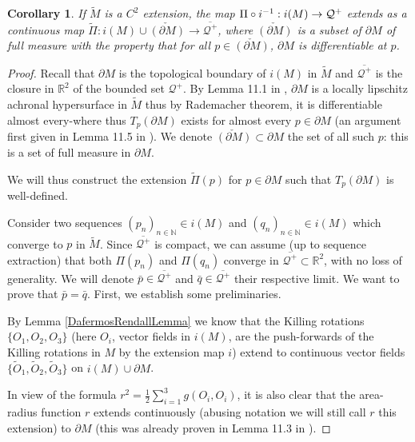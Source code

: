 \documentclass[10pt,a4paper]{article}
\theoremstyle{plain}
\newtheorem{cor}[thm]{Corollary}
\theoremstyle{remark}
\newcommand{\Oo}{\tilde{O}_1}
\newcommand{\Ot}{\tilde{O}_2}
\newcommand{\Oth}{\tilde{O}_3}
\theoremstyle{definition}
\newcommand{\RR}{\mathbb{R}}
\theoremstyle{plain}
\theoremstyle{remark}
\theoremstyle{definition}
\numberwithin{equation}{section}
\begin{document}
\begin{cor} \label{Piextension}
If $\tilde{M}$ is a $C^2$ extension, the map $\Pi \circ i^{-1}: i(M) \color{black} \rightarrow \mathcal{Q}^+$ extends as a continuous map 	$\tilde{\Pi}: i(M) \cup\check{(\partial M)}  \rightarrow \overline{\mathcal{Q}^+}$, where $\check{(\partial M)}$ is a subset of $\partial M$ of full measure with the property that for all $p\in \check{(\partial M)}$,  $\partial M$ is differentiable at $p$. 
\end{cor}\begin{proof} 
Recall that $\partial M$ is the topological boundary of $i(M)$ in $\tilde{M}$ and $\overline{\mathcal{Q}^+}$ is the closure in $\RR^{2}$ of the bounded set $\mathcal{Q}^+$. By Lemma 11.1 in \cite{JonathanStab}, $\partial M$ is a locally lipschitz achronal hypersurface in $\tilde{M}$ thus by Rademacher theorem, it is differentiable almost every-where thus $T_p (\partial M)$ exists for almost every $p \in \partial M$ (an argument first given in Lemma 11.5 in \cite{JonathanStab}). We denote  $\check{(\partial M)} \subset \partial M$  the set of all such $p$: this is a set of full measure in $\partial M$.

We will thus construct the extension $\tilde{\Pi}(p)$ for $p\in \partial M$ such that $T_p(\partial M)$ is well-defined. 
 
 
Consider two sequences $(p_n)_{n \in \mathbb{N}} \in i(M)$ and  $(q_n)_{n \in \mathbb{N}} \in i(M)$ which converge to $p$ in $\tilde{M}$. Since $\overline{\mathcal{Q}^+}$ is compact, we can assume (up to sequence extraction) that both $\Pi(p_n)$ and $\Pi(q_n)$ converge in  $\overline{\mathcal{Q}^+} \subset \RR^2$, with no loss of generality. We will denote $\bar{p}  \in \overline{\mathcal{Q}^+}$ and $\bar{q}  \in \overline{\mathcal{Q}^+}$ their respective limit. We want to prove that $\bar{p}=\bar{q}$. First, we establish some preliminaries.
 

 
 By Lemma \ref{DafermosRendallLemma} we know that the Killing rotations $\{ O_1, O_2, O_3\}$ (here $O_i$, vector fields in $i(M)$, are the push-forwards of the Killing rotations in $M$ by the extension map $i$) extend to continuous vector fields $\{ \Oo, \Ot, \Oth\}$ on $i(M) \cup \partial M$.
 
 
  In view of the formula $r^2= \frac{1}{2} \sum_{i=1}^3 g(O_i,O_i)$, it is also clear that the area-radius function $r$ extends continuously (abusing notation we will still call $r$ this extension) to $\partial M$ (this was already proven in Lemma 11.3 in \cite{JonathanStab}). 
  

\end{proof}
\end{document}
